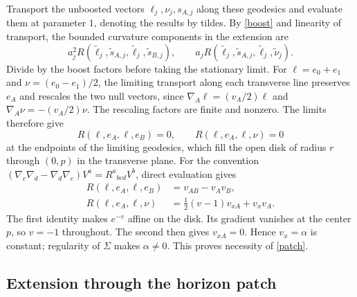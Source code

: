 \documentclass[12pt]{article}
\begin{document}
Transport the unboosted vectors \(\ell_j,\nu_j,s_{A,j}\) along these
geodesics and evaluate them at parameter \(1\), denoting the results
by tildes. By \eqref{boost} and linearity of transport, the bounded
curvature components in the extension are
\[
 a_j^2 R(\widetilde\ell_j,\widetilde s_{A,j},
          \widetilde\ell_j,\widetilde s_{B,j}),
 \qquad
 a_j R(\widetilde\ell_j,\widetilde s_{A,j},
        \widetilde\ell_j,\widetilde\nu_j).
\]
Divide by the boost factors before taking the stationary limit.
For \(\ell=e_0+e_1\) and \(\nu=(e_0-e_1)/2\), the limiting transport
along each transverse line preserves \(e_A\) and rescales the two null
vectors, since \(\nabla_A\ell=(v_A/2)\ell\) and
\(\nabla_A\nu=-(v_A/2)\nu\). The rescaling factors are finite and
nonzero. The limits therefore give
\begin{equation}
 R(\ell,e_A,\ell,e_B)=0,\qquad R(\ell,e_A,\ell,\nu)=0
 \label{vanish}
\end{equation}
at the endpoints of the limiting geodesics, which fill the open disk
of radius \(r\) through \((0,p)\) in the transverse plane.
For the convention
\((\nabla_c\nabla_d-\nabla_d\nabla_c)V^a=R^a{}_{bcd}V^b\), direct evaluation gives
\begin{equation}
 \begin{split}
 R(\ell,e_A,\ell,e_B)&=v_{AB}-v_Av_B,\\
 R(\ell,e_A,\ell,\nu)&=\tfrac12(v-1)v_{xA}+v_xv_A .
 \end{split}
 \label{curvature}
\end{equation}
The first identity makes \(e^{-v}\) affine on the disk. Its gradient vanishes
at the center \(p\), so \(v=-1\) throughout.
The second then gives \(v_{xA}=0\). Hence \(v_x=\alpha\) is constant;
regularity of \(\Sigma\) makes \(\alpha\ne0\).
This proves necessity of \eqref{patch}.

\subsection{Extension through the horizon patch}
\end{document}
